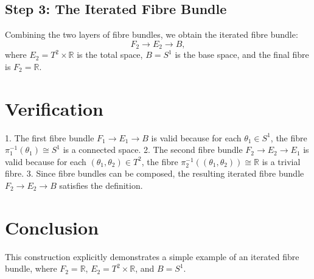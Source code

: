 \documentclass[12pt]{article}
\begin{document}
\subsection*{Step 3: The Iterated Fibre Bundle}
Combining the two layers of fibre bundles, we obtain the iterated fibre bundle:
\[
F_2 \to E_2 \to B,
\]
where $E_2 = T^2 \times \mathbb{R}$ is the total space, $B = S^1$ is the base space, and the final fibre is $F_2 = \mathbb{R}$.

\section*{Verification}
1. The first fibre bundle $F_1 \to E_1 \to B$ is valid because for each $\theta_1 \in S^1$, the fibre $\pi_1^{-1}(\theta_1) \cong S^1$ is a connected space.
2. The second fibre bundle $F_2 \to E_2 \to E_1$ is valid because for each $(\theta_1, \theta_2) \in T^2$, the fibre $\pi_2^{-1}((\theta_1, \theta_2)) \cong \mathbb{R}$ is a trivial fibre.
3. Since fibre bundles can be composed, the resulting iterated fibre bundle $F_2 \to E_2 \to B$ satisfies the definition.

\section*{Conclusion}
This construction explicitly demonstrates a simple example of an iterated fibre bundle, where $F_2 = \mathbb{R}$, $E_2 = T^2 \times \mathbb{R}$, and $B = S^1$.
\end{document}
